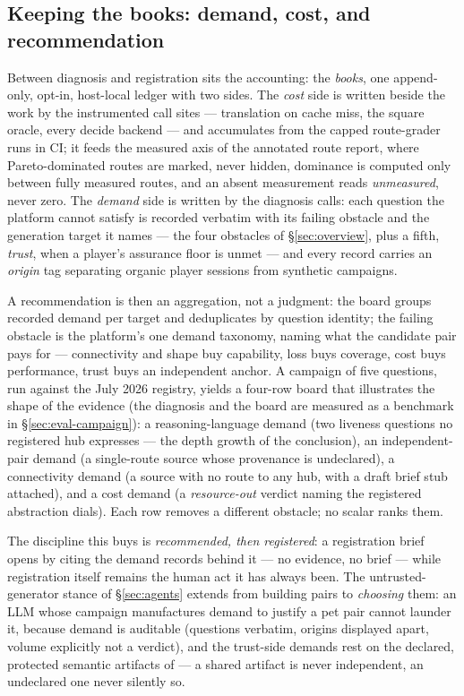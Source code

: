 \subsection{Keeping the books: demand, cost, and recommendation}
\label{sec:books}

Between diagnosis and registration sits the accounting: the
\emph{books}, one append-only, opt-in, host-local ledger with two
sides.
The \emph{cost} side is written beside the work by the instrumented call
sites --- translation on cache miss, the square oracle, every decide
backend --- and accumulates from the capped route-grader runs in CI; it
feeds the measured axis of the annotated route report, where
Pareto-dominated routes are marked, never hidden, dominance is computed
only between fully measured routes, and an absent measurement reads
\emph{unmeasured}, never zero. The \emph{demand} side is written by the
diagnosis calls: each question the platform cannot satisfy is recorded
verbatim with its failing obstacle and the generation target it names
--- the four obstacles of \S\ref{sec:overview}, plus a fifth,
\emph{trust}, when a player's assurance floor is unmet --- and every
record carries an \emph{origin} tag separating organic player sessions
from synthetic campaigns.

A recommendation is then an aggregation, not a judgment: the board
groups recorded demand per target and deduplicates by question
identity; the failing obstacle is the platform's one demand taxonomy,
naming what the candidate pair pays for --- connectivity and shape buy
capability, loss buys coverage, cost buys performance, trust buys an
independent anchor. A
campaign of five questions, run against the July 2026 registry, yields
a four-row board that illustrates the shape of the evidence (the
diagnosis and the board are measured as a benchmark in
\S\ref{sec:eval-campaign}): a
reasoning-language demand (two liveness questions no registered hub
expresses --- the depth growth of the conclusion), an independent-pair
demand (a single-route source whose provenance is undeclared), a
connectivity demand (a source with no route to any hub, with a draft
brief stub attached), and a cost demand (a \emph{resource-out}
verdict naming the registered abstraction dials). Each row removes a
different obstacle; no scalar ranks them.

The discipline this buys is \emph{recommended, then registered}: a
registration brief opens by citing the demand records behind it --- no
evidence, no brief --- while registration itself remains the human act
it has always been. The untrusted-generator stance of
\S\ref{sec:agents} extends from building pairs to \emph{choosing} them:
an LLM whose campaign manufactures demand to justify a pet pair cannot
launder it, because demand is auditable (questions verbatim, origins
displayed apart, volume explicitly not a verdict), and the trust-side
demands rest on the declared, protected semantic artifacts of
 --- a shared artifact is never independent, an
undeclared one never silently so.
